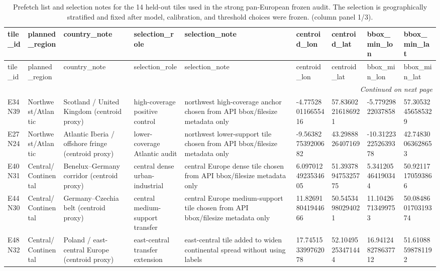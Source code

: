 \begin{landscape}
\scriptsize
\setlength{\LTleft}{0pt}
\setlength{\LTright}{0pt}
\begin{longtable}{lllllllll}
\caption{Prefetch list and selection notes for the 14 held-out tiles used in the strong pan-European frozen audit. The selection is geographically stratified and fixed after model, calibration, and threshold choices were frozen. (column panel 1/3).}\label{tab:e7_strong_selected_tiles}\\
\toprule
tile\_id & planned\_region & country\_note & selection\_role & selection\_note & centroid\_lon & centroid\_lat & bbox\_min\_lon & bbox\_min\_lat \\
\midrule
\endfirsthead
\toprule
tile\_id & planned\_region & country\_note & selection\_role & selection\_note & centroid\_lon & centroid\_lat & bbox\_min\_lon & bbox\_min\_lat \\
\midrule
\endhead
\midrule
\multicolumn{9}{r}{\textit{Continued on next page}} \\
\endfoot
\bottomrule
\endlastfoot
E34N39 & Northwest/Atlantic & Scotland / United Kingdom (centroid proxy) & high-coverage positive control & northwest high-coverage anchor chosen from API bbox/filesize metadata only & -4.775280116655416 & 57.83602216186921 & -5.77929822037858 & 57.30532456585329 \\
E27N24 & Northwest/Atlantic & Atlantic Iberia / offshore fringe (centroid proxy) & lower-coverage Atlantic audit & northwest lower-support tile chosen from API bbox/filesize metadata only & -9.563827539200682 & 43.2988826407169 & -10.312232252639378 & 42.74830063628653 \\
E40N31 & Central/Continental & Benelux–Germany corridor (centroid proxy) & central dense urban-industrial & central Europe dense tile chosen from API bbox/filesize metadata only & 6.0970124923534605 & 51.393789475325775 & 5.341205464190344 & 50.92117170593866 \\
E44N30 & Central/Continental & Germany–Czechia belt (centroid proxy) & central medium-support transfer & central Europe medium-support tile chosen from API bbox/filesize metadata only & 11.826918041944666 & 50.54534980294021 & 11.10426713499753 & 50.084860170319374 \\
E48N32 & Central/Continental & Poland / east-central Europe (centroid proxy) & east-central transfer extension & east-central tile added to widen continental spread without using labels & 17.745153399762078 & 52.10495253471444 & 16.941248278637712 & 51.61088598781192 \\

\end{longtable}
\end{landscape}
